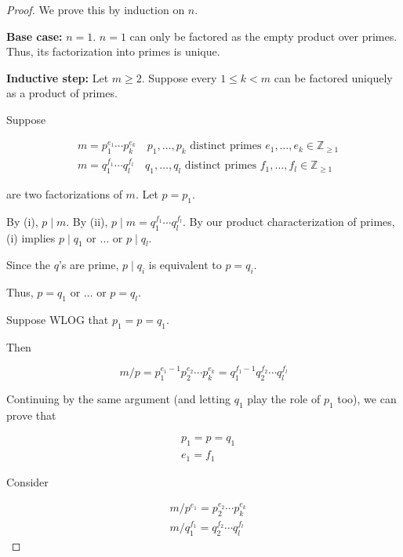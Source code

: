 \documentclass[11pt]{article}
\begin{document}
\begin{proof}
    We prove this by induction on \(n\).

    \textbf{Base case:} \(n = 1\). \(n = 1\) can only be factored as the empty product over primes. Thus, its factorization into primes is unique.

    \textbf{Inductive step:} Let \(m \geq 2\). Suppose every \(1 \leq k < m\) can be factored uniquely as a product of primes.

    Suppose

    \[
        \begin{aligned}
             & m = p_1^{e_1} \cdots p_k^{e_k} \quad p_1, \ldots, p_k \text{ distinct primes } e_1, \ldots, e_k \in \mathbb{Z}_{\geq 1} \\
             & m = q_1^{f_1} \cdots q_l^{f_l} \quad q_1, \ldots, q_l \text{ distinct primes } f_1, \ldots, f_l \in \mathbb{Z}_{\geq 1}
        \end{aligned}
    \]

    are two factorizations of \(m\). Let \(p = p_1\).

    By (i), \(p \mid m\). By (ii), \(p \mid m = q_1^{f_1} \cdots q_l^{f_l}\). By
    our product characterization of primes, (i) implies \(p \mid q_1\) or
    \(\ldots\) or \(p \mid q_l\).

    Since the \(q\)'s are prime, \(p \mid q_i\) is equivalent to \(p = q_i\).

    Thus, \(p = q_1\) or \(\ldots\) or \(p = q_l\).

    Suppose WLOG that \(p_1 = p = q_1\).

    Then

    \[
        m / p = p_1^{e_1 - 1} p_2^{e_2} \cdots p_k^{e_k} = q_1^{f_1 - 1} q_2^{f_2} \cdots q_l^{f_l}
    \]

    Continuing by the same argument (and letting \(q_1\) play the role of \(p_1\)
    too), we can prove that

    \[
        \begin{aligned}
             & p_1 = p = q_1 \\
             & e_1 = f_1
        \end{aligned}
    \]

    Consider

    \[
        \begin{aligned}
             & m / p^{e_1} = p_2^{e_2} \cdots p_k^{e_k}   \\
             & m / q_1^{f_1} = q_2^{f_2} \cdots q_l^{f_l}
        \end{aligned}
    \]


\end{proof}
\end{document}
